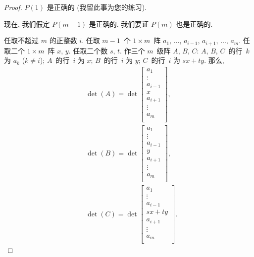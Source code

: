 \documentclass[%
    UTF8,%
    fontset=none,%
    punct=kaiming,%
    zihao=-4,%
    a4paper,%
    oneside,%
]{ctexbook}
\begin{document}
\begin{proof}
    \(P(1)\) 是正确的 (我留此事为您的练习).

    现在, 我们假定 \(P(m-1)\) 是正确的.
    我们要证 \(P(m)\) 也是正确的.

    任取不超过 \(m\) 的正整数 \(i\).
    任取 \(m-1\)~个 \(1 \times m\)~阵
    \(a_1\), \(\dots\), \(a_{i-1}\),
    \(a_{i+1}\), \(\dots\), \(a_m\).
    任取二个 \(1 \times m\)~阵 \(x\), \(y\).
    任取二个数 \(s\), \(t\).
    作三个 \(m\)~级阵 \(A\), \(B\), \(C\):
    \(A\), \(B\), \(C\)~的行~\(k\) 为 \(a_k\) (\(k \neq i\));
    \(A\)~的行~\(i\) 为 \(x\);
    \(B\)~的行~\(i\) 为 \(y\);
    \(C\)~的行~\(i\) 为 \(sx + ty\).
    那么,
    \begin{align*}
         & \det {(A)}
        = \det
        {\begin{bmatrix}
                 a_1     \\
                 \vdots  \\
                 a_{i-1} \\
                 x       \\
                 a_{i+1} \\
                 \vdots  \\
                 a_{m}   \\
             \end{bmatrix}},
        \\
         & \det {(B)}
        = \det
        {\begin{bmatrix}
                 a_1     \\
                 \vdots  \\
                 a_{i-1} \\
                 y       \\
                 a_{i+1} \\
                 \vdots  \\
                 a_{m}   \\
             \end{bmatrix}},
        \\
         & \det {(C)}
        = \det
        {\begin{bmatrix}
                 a_1     \\
                 \vdots  \\
                 a_{i-1} \\
                 sx + ty \\
                 a_{i+1} \\
                 \vdots  \\
                 a_{m}   \\
             \end{bmatrix}}.
    \end{align*}


\end{proof}
\end{document}
